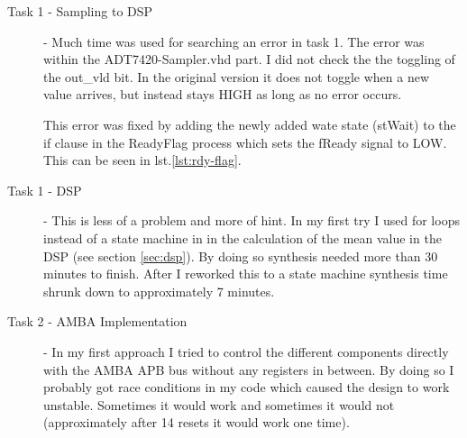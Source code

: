 \documentclass[%
	a4paper,
]
{article}
\begin{document}
\begin{description}
\item[Task 1 - Sampling to DSP] - Much time was used for searching an error in task 1. The error was
within the ADT7420-Sampler.vhd part. I did not check the the toggling of the out\_vld 
bit. In the original version it does not toggle when a new value arrives, but instead 
stays HIGH as long as no error occurs.

This error was fixed by adding the newly added wate state (stWait) to the if clause in the 
ReadyFlag process which sets the fReady signal to LOW.
This can be seen in lst.\ref{lst:rdy-flag}.


\item[Task 1 - DSP] - This is less of a problem and more of hint. In my first try I used
for loops instead of a state machine in in the calculation of the mean value in the DSP 
(see section \ref{sec:dsp}). By doing so synthesis needed more than 30 minutes to finish.
After I reworked this to a state machine synthesis time shrunk down to approximately 7 
minutes.    


\item[Task 2 - AMBA Implementation] - In my first approach I tried to control the different
components directly with the AMBA APB bus without any registers in between. By doing so I
probably got race conditions in my code which caused the design to work unstable. Sometimes
it would work and sometimes it would not (approximately after 14 resets it would work one time).
\end{description}






%
%
\end{document}
